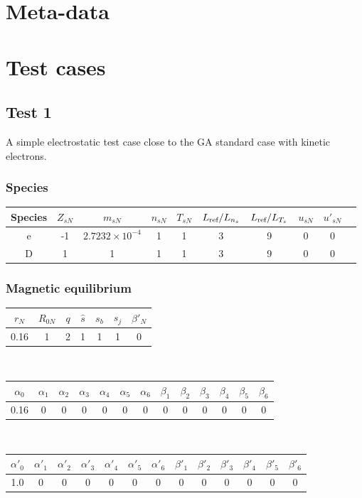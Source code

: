 \documentclass[fleqn]{report}
\begin{document}
\chapter{Meta-data}



\chapter{Test cases}

\section{Test 1}
A simple electrostatic test case close to the GA standard case with kinetic electrons.
\subsection{Species}
\begin{tabular}{c c c c c c c c c c}
\hline
Species & $Z_{sN}$ & $m_{sN}$ & $n_{sN}$ & $T_{sN}$ & $L_{\textrm{ref}}/L_{n_s}$ & $L_{\textrm{ref}}/L_{T_s}$ & $u_{sN}$ & $u'_{sN}$ \\ [0.5ex]
\hline
e & -1 & $2.7232\times10^{-4}$ & 1 & 1 & 3 & 9 & 0 & 0 \\ [0.5ex]
\hline 
D &  1 & 1 & 1 & 1 & 3 & 9 & 0 & 0 \\ [0.5ex]
\hline
\end{tabular}

\subsection{Magnetic equilibrium}
\begin{tabular}{c c c c c c c}
\hline
$r_N$ & $R_{0N}$ & $q$ & $\hat{s}$ & $s_b$ & $s_j$ & $\beta'_N$ \\ [0.5ex]
\hline
0.16 & 1 & 2 & 1 & 1 & 1 & 0 \\
\hline
\end{tabular}\\
\begin{tabular}{c c c c c c c c c c c c c}
\hline
$\alpha_0$ & $\alpha_1$ & $\alpha_2$ & $\alpha_3$ & $\alpha_4$ & $\alpha_5$ & $\alpha_6$ 
& $\beta_1$ & $\beta_2$ & $\beta_3$ & $\beta_4$ & $\beta_5$ & $\beta_6$   \\ [0.5ex]
\hline
 0.16 & 0 & 0 & 0 & 0 & 0 & 0 & 0 & 0 & 0 & 0 & 0 & 0 \\
\hline
\end{tabular}\\
\begin{tabular}{c c c c c c c c c c c c c}
\hline
$\alpha'_0$ & $\alpha'_1$ & $\alpha'_2$ & $\alpha'_3$ & $\alpha'_4$ & $\alpha'_5$ & $\alpha'_6$ 
& $\beta'_1$ & $\beta'_2$ & $\beta'_3$ & $\beta'_4$ & $\beta'_5$ & $\beta'_6$   \\ [0.5ex]
\hline
1.0 & 0 & 0 & 0 & 0 & 0  & 0 & 0 & 0 & 0  & 0 & 0 & 0 \\
\hline
\end{tabular}
\end{document}
